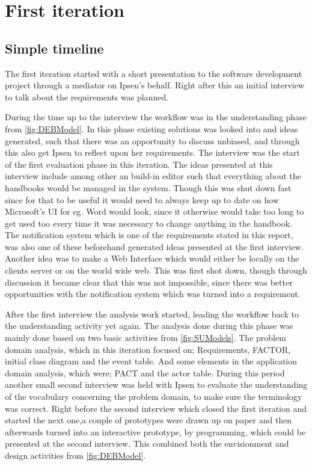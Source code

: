 \section{First iteration}\label{sec:Iteration1}
\subsection{Simple timeline}\label{sec:1-simpleTime}
The first iteration started with a short presentation to the software development project through a mediator on Ipsen's behalf.
Right after this an initial interview to talk about the requirements was planned.

During the time up to the interview the workflow was in the understanding phase from \cref{fig:DEBModel}.
In this phase existing solutions was looked into and ideas generated, such that there was an opportunity to discuss unbiased, and through this also get Ipsen to reflect upon her requirements.
The interview was the start of the first evaluation phase in this iteration.
The ideas presented at this interview include among other an build-in editor such that everything about the handbooks would be managed in the system.
Though this was shut down fast since for that to be useful it would need to always keep up to date on how Microsoft's UI for eg. Word would look, since it otherwise would take too long to get used too every time it was necessary to change anything in the handbook.
The notification system which is one of the requirements stated in this report, was also one of these beforehand generated ideas presented at the first interview. 
Another idea was to make a Web Interface which would either be locally on the clients server or on the world wide web. This was first shot down, though through discussion it became clear that this was not impossible, since there was better opportunities with the notification system which was turned into a requirement.

After the first interview the analysis work started, leading the workflow back to the understanding activity yet again.
The analysis done during this phase was mainly done based on two basic activities from \cref{fig:SUModels}.
The problem domain analysis, which in this iteration focused on; Requirements, FACTOR, initial class diagram and the event table.
And some elements in the application domain analysis, which were; PACT and the actor table.
During this period another small second interview was held with Ipsen to evaluate the understanding of the vocabulary concerning the problem domain, to make sure the terminology was correct.
Right before the second interview which closed the first iteration and started the next one,a couple of prototypes were drawn up on paper and then afterwards turned into an interactive prototype, by programming, which could be presented at the second interview.
This combined both the envisionment and design activities from \cref{fig:DEBModel}.


